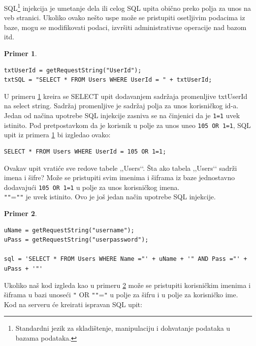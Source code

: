 \documentclass[a4paper]{article}
\theoremstyle{break}
\newtheorem{primer}{Primer}[section]
\begin{document}
{SQL\footnote{Standardni jezik za skladištenje, manipulaciju i dohvatanje podataka u bazama podataka.} injekcija je umetanje dela ili celog SQL upita obično preko polja za unos na veb stranici. Ukoliko ovako nešto uspe može se pristupiti osetljivim podacima iz baze, mogu se modifikovati podaci, izvršiti administrativne operacije nad bazom itd. 

\begin{primer}
\label{primer_1}
\begin{lstlisting}[frame=single]
txtUserId = getRequestString("UserId");
txtSQL = "SELECT * FROM Users WHERE UserId = " + txtUserId;
\end{lstlisting}
\end{primer}
\noindent U primeru \ref{primer_1} kreira se SELECT upit dodavanjem sadržaja promenljive txtUserId na select string. Sadržaj promenljive je sadržaj polja za unos korisničkog id-a.\\

Jedan od načina upotrebe SQL injekcije zasniva se na činjenici da je \texttt{1=1} uvek istinito. Pod pretpostavkom da je korisnik u polje za unos uneo \texttt{105 OR 1=1}, SQL upit iz primera \ref{primer_1} bi izgledao ovako:

\begin{lstlisting}[frame=single]
SELECT * FROM Users WHERE UserId = 105 OR 1=1;
\end{lstlisting}
\noindent Ovakav upit vratiće sve redove tabele ,,Users‘‘. Šta ako tabela ,,Users‘‘ sadrži imena i šifre? Može se pristupiti svim imenima i šiframa iz baze jednostavno dodavajući \texttt{105 OR 1=1} u polje za unos korisničkog imena.\\

\texttt{"}\texttt{"}=\texttt{"}\texttt{"} je uvek istinito. Ovo je još jedan način upotrebe SQL injekcije.
\begin{primer}
\label{primer_2}
\begin{lstlisting}[frame=single]
uName = getRequestString("username");
uPass = getRequestString("userpassword");

sql = 'SELECT * FROM Users WHERE Name ="' + uName + '" AND Pass ="' + uPass + '"'
\end{lstlisting}
\end{primer}

\noindent Ukoliko naš kod izgleda kao u primeru \ref{primer_2} može se pristupiti korisničkim imenima i šiframa u bazi unoseći \texttt{"} OR \texttt{"}\texttt{"}=\texttt{"} u polje za šifru i u polje za korisničko ime. Kod na serveru će kreirati ispravan SQL upit:

}
\end{document}
